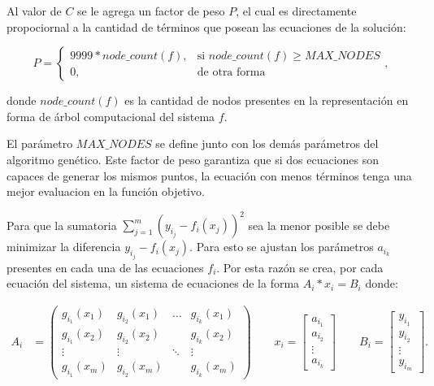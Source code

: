 Al valor de $C$ se le agrega un factor de peso $P$, el cual es directamente propociornal a la cantidad de términos que posean las ecuaciones de la solución:

$$P = \begin{cases}
        9999 * node\_count(f), & \text{si } node\_count(f) \geq MAX\_NODES \\
        0,                     & \text{de otra forma}
    \end{cases},$$

donde $node\_count(f)$ es la cantidad de nodos presentes en la representación en forma de árbol computacional del sistema $f$.

El parámetro $MAX\_NODES$ se define junto con los demás parámetros del algoritmo genético. Este factor de peso garantiza que si dos ecuaciones son capaces de generar los mismos puntos, la ecuación con menos términos tenga una mejor evaluacion en la función objetivo.

Para que la sumatoria $\sum_{j=1}^{m}(y_{i_j} - f_i(x_j)) ^ 2$ sea la menor posible se debe minimizar la diferencia $y_{i_j} - f_i(x_j)$. Para esto se ajustan los parámetros $a_{i_k}$ presentes en cada una de las ecuaciones $f_i$. Por esta razón se crea, por cada ecuación del sistema, un sistema de ecuaciones de la forma $A_i * x_i = B_i$ donde:

\begin{align*}
    A_i & = \begin{pmatrix}
        g_{i_1}(x_1) & g_{i_2}(x_1) & \dots  & g_{i_k}(x_1) \\
        g_{i_1}(x_2) & g_{i_2}(x_2) &        & g_{i_k}(x_2) \\
        \vdots       & \vdots       & \ddots & \vdots       \\
        g_{i_1}(x_m) & g_{i_2}(x_m) &        & g_{i_k}(x_m)
    \end{pmatrix}
    \qquad
    x_i = \begin{bmatrix}
        a_{i_1} \\
        a_{i_2} \\
        \vdots  \\
        a_{i_k}
    \end{bmatrix}
    \qquad
    B_i = \begin{bmatrix}
        y_{i_1} \\
        y_{i_2} \\
        \vdots  \\
        y_{i_m}
    \end{bmatrix}.
\end{align*}

